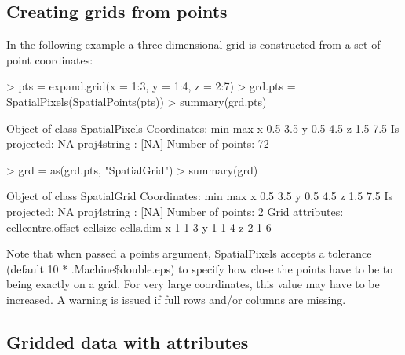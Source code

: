 \documentclass{article}
\begin{document}
\subsection{Creating grids from points}
In the following example a three-dimensional grid is constructed from
a set of point coordinates:
\begin{Schunk}
\begin{Sinput}
> pts = expand.grid(x = 1:3, y = 1:4, z = 2:7)
> grd.pts = SpatialPixels(SpatialPoints(pts))
> summary(grd.pts)
\end{Sinput}
\begin{Soutput}
Object of class SpatialPixels
Coordinates:
  min max
x 0.5 3.5
y 0.5 4.5
z 1.5 7.5
Is projected: NA 
proj4string : [NA]
Number of points: 72
\end{Soutput}
\begin{Sinput}
> grd = as(grd.pts, "SpatialGrid")
> summary(grd)
\end{Sinput}
\begin{Soutput}
Object of class SpatialGrid
Coordinates:
  min max
x 0.5 3.5
y 0.5 4.5
z 1.5 7.5
Is projected: NA 
proj4string : [NA]
Number of points: 2
Grid attributes:
  cellcentre.offset cellsize cells.dim
x                 1        1         3
y                 1        1         4
z                 2        1         6
\end{Soutput}
\end{Schunk}
Note that when passed a points argument, SpatialPixels accepts a tolerance
(default 10 * .Machine\$double.eps) to specify how close the points have
to be to being exactly on a grid. For very large coordinates, this value
may have to be increased. A warning is issued if full rows and/or columns
are missing.

\subsection{Gridded data with attributes}
\end{document}

